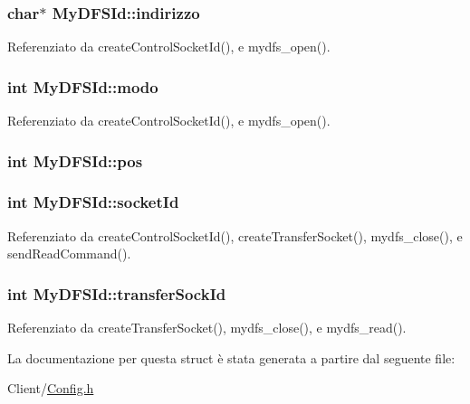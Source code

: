 \subsubsection[{indirizzo}]{\setlength{\rightskip}{0pt plus 5cm}char$\ast$ My\+D\+F\+S\+Id\+::indirizzo}\label{structMyDFSId_ac8c10a1a5b18776bf5e5585ee9e26331}


Referenziato da create\+Control\+Socket\+Id(), e mydfs\+\_\+open().

\hypertarget{structMyDFSId_a98bc5ce1a7734459d8b81c997da4e9f0}{}
\subsubsection[{modo}]{\setlength{\rightskip}{0pt plus 5cm}int My\+D\+F\+S\+Id\+::modo}\label{structMyDFSId_a98bc5ce1a7734459d8b81c997da4e9f0}


Referenziato da create\+Control\+Socket\+Id(), e mydfs\+\_\+open().

\hypertarget{structMyDFSId_aaeac229fb85c313f91a76f00be916832}{}
\subsubsection[{pos}]{\setlength{\rightskip}{0pt plus 5cm}int My\+D\+F\+S\+Id\+::pos}\label{structMyDFSId_aaeac229fb85c313f91a76f00be916832}
\hypertarget{structMyDFSId_a382a74f109962751085cea7aac2892cc}{}
\subsubsection[{socket\+Id}]{\setlength{\rightskip}{0pt plus 5cm}int My\+D\+F\+S\+Id\+::socket\+Id}\label{structMyDFSId_a382a74f109962751085cea7aac2892cc}


Referenziato da create\+Control\+Socket\+Id(), create\+Transfer\+Socket(), mydfs\+\_\+close(), e send\+Read\+Command().

\hypertarget{structMyDFSId_a3b62a6d0f52a871bda4bf9cd56c57ff7}{}
\subsubsection[{transfer\+Sock\+Id}]{\setlength{\rightskip}{0pt plus 5cm}int My\+D\+F\+S\+Id\+::transfer\+Sock\+Id}\label{structMyDFSId_a3b62a6d0f52a871bda4bf9cd56c57ff7}


Referenziato da create\+Transfer\+Socket(), mydfs\+\_\+close(), e mydfs\+\_\+read().



La documentazione per questa struct è stata generata a partire dal seguente file\+:\begin{DoxyCompactItemize}
\item 
Client/\hyperlink{Client_2Config_8h}{Config.\+h}\end{DoxyCompactItemize}
